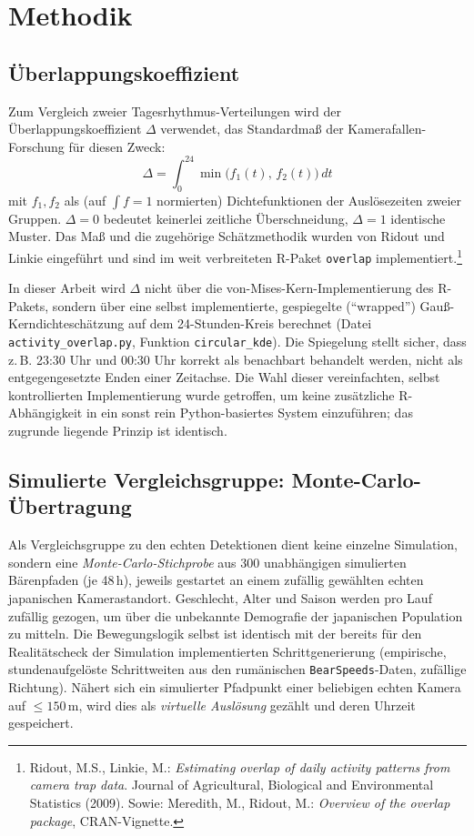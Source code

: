 \documentclass[11pt,a4paper]{article}
\begin{document}
\section{Methodik}

\subsection{\"Uberlappungskoeffizient}

Zum Vergleich zweier Tagesrhythmus-Verteilungen wird der
\"Uberlappungskoeffizient $\Delta$ verwendet, das Standardma{\ss} der
Kamerafallen-Forschung f\"ur diesen Zweck:
\begin{equation}
  \Delta = \int_0^{24} \min\bigl(f_1(t),\, f_2(t)\bigr)\, dt
\end{equation}
mit $f_1, f_2$ als (auf $\int f = 1$ normierten) Dichtefunktionen der
Ausl\"osezeiten zweier Gruppen. $\Delta = 0$ bedeutet keinerlei zeitliche
\"Uberschneidung, $\Delta = 1$ identische Muster. Das Ma{\ss} und die
zugeh\"orige Sch\"atzmethodik wurden von Ridout und Linkie eingef\"uhrt und
sind im weit verbreiteten R-Paket \texttt{overlap} implementiert.\footnote{Ridout,
M.S., Linkie, M.: \emph{Estimating overlap of daily activity patterns from
camera trap data}. Journal of Agricultural, Biological and Environmental
Statistics (2009). Sowie: Meredith, M., Ridout, M.: \emph{Overview of the
overlap package}, CRAN-Vignette.}

In dieser Arbeit wird $\Delta$ nicht \"uber die von-Mises-Kern-Implementierung
des R-Pakets, sondern \"uber eine selbst implementierte, gespiegelte
("`wrapped"') Gau{\ss}-Kerndichtesch\"atzung auf dem 24-Stunden-Kreis
berechnet (Datei \texttt{activity\_overlap.py}, Funktion
\texttt{circular\_kde}). Die Spiegelung stellt sicher, dass z.\,B. 23:30 Uhr
und 00:30 Uhr korrekt als benachbart behandelt werden, nicht als
entgegengesetzte Enden einer Zeitachse. Die Wahl dieser vereinfachten,
selbst kontrollierten Implementierung wurde getroffen, um keine zus\"atzliche
R-Abh\"angigkeit in ein sonst rein Python-basiertes System einzuf\"uhren; das
zugrunde liegende Prinzip ist identisch.

\subsection{Simulierte Vergleichsgruppe: Monte-Carlo-\"Ubertragung}

Als Vergleichsgruppe zu den echten Detektionen dient keine einzelne
Simulation, sondern eine \emph{Monte-Carlo-Stichprobe} aus 300 unabh\"angigen
simulierten B\"arenpfaden (je 48\,h), jeweils gestartet an einem
zuf\"allig gew\"ahlten echten japanischen Kamerastandort. Geschlecht, Alter
und Saison werden pro Lauf zuf\"allig gezogen, um \"uber die unbekannte
Demografie der japanischen Population zu mitteln. Die Bewegungslogik selbst
ist identisch mit der bereits f\"ur den Realit\"atscheck der Simulation
implementierten Schrittgenerierung (empirische, stundenaufgel\"oste
Schrittweiten aus den rum\"anischen \texttt{BearSpeeds}-Daten, zuf\"allige
Richtung). N\"ahert sich ein simulierter Pfadpunkt einer beliebigen echten
Kamera auf $\leq 150\,$m, wird dies als \emph{virtuelle Ausl\"osung}
gez\"ahlt und deren Uhrzeit gespeichert.
\end{document}
